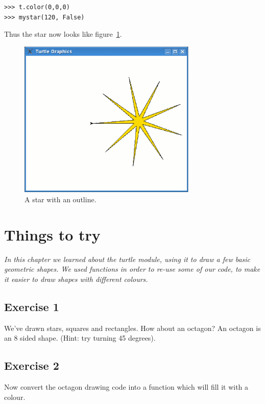 \begin{listing}
\begin{verbatim}
>>> t.color(0,0,0)
>>> mystar(120, False)
\end{verbatim}
\end{listing}

\noindent
Thus the star now looks like figure~\ref{fig30}.

\begin{figure}
\begin{center}
\includegraphics[width=85mm]{eps/figure30.eps}
\end{center}
\caption{A star with an outline.}\label{fig30}
\end{figure}

\section{Things to try}

\emph{In this chapter we learned about the turtle module, using it to draw a few basic geometric shapes. We used functions in order to re-use some of our code, to make it easier to draw shapes with different colours.}

\subsection*{Exercise 1}
We've drawn stars, squares and rectangles.  How about an octagon?  An octagon is an 8 sided shape.
(Hint: try turning 45 degrees).

\subsection*{Exercise 2}
Now convert the octagon drawing code into a function which will fill it with a colour.

\newpage
